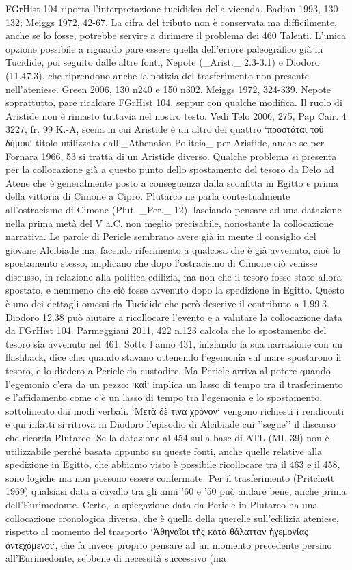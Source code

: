             FGrHist 104 riporta l'interpretazione tucididea della vicenda. Badian 1993, 130-132; Meiggs 1972, 42-67. La cifra del tributo non è conservata ma difficilmente, anche se lo fosse, potrebbe servire a dirimere il problema dei 460 Talenti. L'unica opzione possibile a riguardo pare essere quella dell'errore paleografico già in Tucidide, poi seguito dalle altre fonti,  Nepote (_Arist._ 2.3-3.1) e  Diodoro (11.47.3), che riprendono anche la notizia del trasferimento non presente nell'ateniese. Green 2006, 130 n240 e 150 n302. Meiggs 1972, 324-339.  Nepote soprattutto, pare ricalcare FGrHist 104, seppur con qualche modifica. Il ruolo di Aristide non è rimasto tuttavia nel nostro testo. Vedi Telo 2006, 275, Pap Cair. 4 3227, fr. 99 K.-A, scena in cui Aristide è un altro dei quattro `προστάται τοῦ δήμου` titolo utilizzato dall'_Athenaion Politeia_ per Aristide, anche se per Fornara 1966, 53 si tratta di un Aristide diverso. Qualche problema si presenta per la collocazione già a questo punto dello spostamento del tesoro da Delo ad Atene che è generalmente posto a conseguenza dalla sconfitta in Egitto e prima della vittoria di  Cimone a Cipro. Plutarco ne parla contestualmente all'ostracismo di  Cimone (Plut. _Per._ 12), lasciando pensare ad una datazione nella prima metà del V a.C. non meglio precisabile, nonostante la collocazione narrativa. Le parole di Pericle  sembrano avere già in mente il consiglio del giovane Alcibiade ma, facendo riferimento a qualcosa che è già avvenuto, cioè lo spostamento stesso, implicano che dopo l'ostracismo di  Cimone ciò venisse discusso, in relazione alla politica edilizia, ma non che il tesoro fosse stato allora spostato, e nemmeno che ciò fosse avvenuto dopo la spedizione in Egitto. Questo è uno dei dettagli omessi da Tucidide che però descrive il contributo a 1.99.3.  Diodoro 12.38 può aiutare a ricollocare l'evento e a valutare la collocazione data da FGrHist 104. Parmeggiani 2011, 422 n.123 calcola che lo spostamento del tesoro sia avvenuto nel 461. Sotto l'anno 431, iniziando la sua narrazione con un flashback, dice che: quando stavano ottenendo l'egemonia sul mare spostarono il tesoro, e lo diedero a Pericle  da custodire. Ma Pericle  arriva al potere quando l'egemonia c'era da un pezzo: `καὶ` implica un lasso di tempo tra il trasferimento e l'affidamento come c'è un lasso di tempo tra l'egemonia e lo spostamento, sottolineato dai modi verbali. `Μετὰ δὲ τινα χρόνον` vengono richiesti i rendiconti e qui infatti si ritrova in  Diodoro l'episodio di Alcibiade cui ''segue'' il discorso che ricorda Plutarco. Se la datazione al 454 sulla base di ATL (ML 39) non è utilizzabile perché basata appunto su queste fonti, anche quelle relative alla spedizione in Egitto, che abbiamo visto è possibile ricollocare tra il 463 e il 458, sono logiche ma non possono essere confermate. Per il trasferimento (Pritchett 1969) qualsiasi data a cavallo tra gli anni '60 e '50 può andare bene, anche prima dell'Eurimedonte. Certo, la spiegazione data da Pericle in Plutarco ha una collocazione cronologica diversa, che è quella della querelle sull'edilizia ateniese, rispetto al momento del trasporto `Ἀθηναῖοι τῆς κατὰ θάλατταν ἡγεμονίας ἀντεχόμενοι`, che fa invece proprio pensare ad un momento precedente persino all'Eurimedonte, sebbene di necessità successivo (ma 